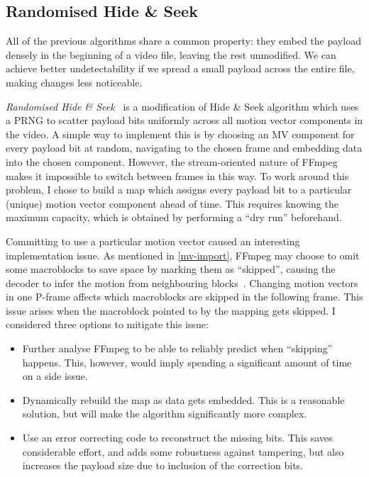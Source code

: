 \documentclass[12pt,british,twoside,notitlepage,usenames,dvipsnames,hypens,final]{report}
\numberwithin{equation}{section}
\numberwithin{figure}{section}
\begin{document}
\subsection{Randomised Hide \& Seek}

All of the previous algorithms share a common property: they embed the payload densely in the beginning of a video file, leaving the rest unmodified. We can achieve better undetectability if we spread a small payload across the entire file, making changes less noticeable. 

\emph{Randomised Hide \& Seek}~\cite{bateman} is a modification of Hide \& Seek algorithm which uses a PRNG to scatter payload bits uniformly across all motion vector components in the video. A simple way to implement this is by choosing an MV component for every payload bit at random, navigating to the chosen frame and embedding data into the chosen component. However, the stream-oriented nature of FFmpeg makes it impossible to switch between frames in this way. To work around this problem, I chose to build a map which assigns every payload bit to a particular (unique) motion vector component ahead of time. This requires knowing the maximum capacity, which is obtained by performing a ``dry run'' beforehand. 

Committing to use a particular motion vector caused an interesting implementation issue. As mentioned in \ref{mv-import}, FFmpeg may choose to omit some macroblocks to save space by marking them as ``skipped'', causing the decoder to infer the motion from neighbouring blocks~\cite{tourapis2004direct}. Changing motion vectors in one P-frame affects which macroblocks are skipped in the following frame. This issue arises when the macroblock pointed to by the mapping gets skipped. I considered three options to mitigate this issue:
\begin{itemize}
\item Further analyse FFmpeg to be able to reliably predict when ``skipping'' happens. This, however, would imply spending a significant amount of time on a side issue.
\item Dynamically rebuild the map as data gets embedded. This is a reasonable solution, but will make the algorithm significantly more complex.
\item Use an error correcting code to reconstruct the missing bits. This saves considerable effort, and adds some robustness against tampering, but also increases the payload size due to inclusion of the correction bits.
\end{itemize}
\end{document}
